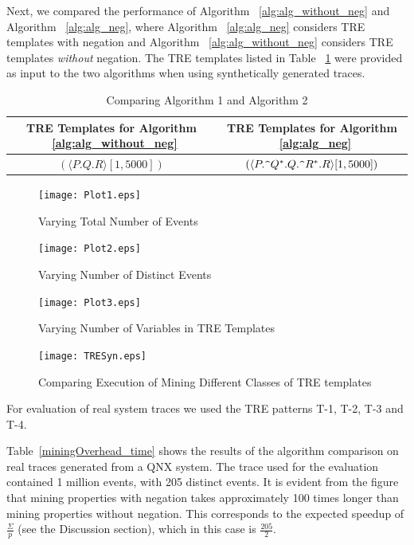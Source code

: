 \documentclass[]{sigplanconf}
\begin{document}
Next, we compared the performance of Algorithm ~\ref{alg:alg_without_neg} and Algorithm ~\ref{alg:alg_neg}, where Algorithm ~\ref{alg:alg_neg} considers TRE templates with negation and Algorithm ~\ref{alg:alg_without_neg} considers TRE templates \emph{without} negation. The TRE templates listed in Table ~\ref{TREs_Syn_Comp} were provided as input to the two algorithms when using synthetically generated traces.

\begin{table}[ht]
	\centering
	\begin{adjustbox}{max width=\columnwidth}
		\begin{tabular}{|c|c|}
			\hline
			\textbf{TRE Templates for Algorithm ~\ref{alg:alg_without_neg}} & \textbf{TRE Templates for Algorithm ~\ref{alg:alg_neg}} \\
			\hline
			 $(\langle P.Q.R \rangle [1, 5000])$& $(\langle P.\verb!^!Q^*.Q.\verb!^!R^*.R \rangle [1, 5000])$  \\
			 \hline
		\end{tabular}
	\end{adjustbox}
	\caption{Comparing Algorithm 1 and Algorithm 2}
	\label{TREs_Syn_Comp}
\end{table}

\begin{figure}[ht]
  \centering
  \texttt{[image: Plot1.eps]}
  \caption{Varying Total Number of Events}	
  \label{fig:plot1}
\end{figure}

\begin{figure}[ht]
  \centering
  \texttt{[image: Plot2.eps]}
  \caption{Varying Number of Distinct Events}	
  \label{fig:plot2}
\end{figure}

\begin{figure}[ht]
  \centering
  \texttt{[image: Plot3.eps]}
  \caption{Varying Number of Variables in TRE Templates}
  \label{fig:plot3}
\end{figure}

\begin{figure}[ht]
  \centering
  \texttt{[image: TRESyn.eps]}
  \caption{Comparing Execution of Mining Different Classes of TRE templates}
  \label{fig:plot4}
\end{figure}

For evaluation of real system traces we used the TRE patterns T-1, T-2, T-3 and T-4.

Table~\ref{miningOverhead_time} shows the results of the algorithm comparison on real traces generated from a QNX system. The trace used for the evaluation contained 1 million events, with 205 distinct events. It is evident from the figure that mining properties with negation takes approximately 100 times longer than mining properties without negation. This corresponds to the expected speedup of $\frac{\Sigma}{p}$ (see the Discussion section), which in this case is $\frac{205}{2}$.
\end{document}

